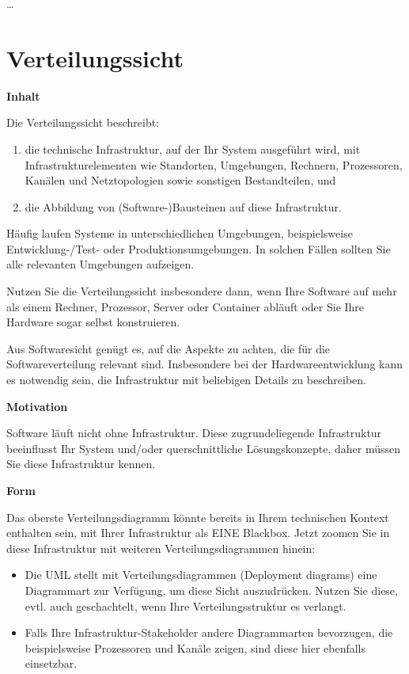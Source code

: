 \documentclass[a4paper,12pt]{article}
\begin{document}
\ldots\hspace{0pt}
\newpage
\section{Verteilungssicht}\label{section-deployment-view}

\textbf{Inhalt}

Die Verteilungssicht beschreibt:

\begin{enumerate}
\def\labelenumi{\arabic{enumi}.}
\item
  die technische Infrastruktur, auf der Ihr System ausgeführt wird, mit
  Infrastrukturelementen wie Standorten, Umgebungen, Rechnern,
  Prozessoren, Kanälen und Netztopologien sowie sonstigen Bestandteilen,
  und
\item
  die Abbildung von (Software-)Bausteinen auf diese Infrastruktur.
\end{enumerate}

Häufig laufen Systeme in unterschiedlichen Umgebungen, beispielsweise
Entwicklung-/Test- oder Produktionsumgebungen. In solchen Fällen sollten
Sie alle relevanten Umgebungen aufzeigen.

Nutzen Sie die Verteilungssicht insbesondere dann, wenn Ihre Software
auf mehr als einem Rechner, Prozessor, Server oder Container abläuft
oder Sie Ihre Hardware sogar selbst konstruieren.

Aus Softwaresicht genügt es, auf die Aspekte zu achten, die für die
Softwareverteilung relevant sind. Insbesondere bei der
Hardwareentwicklung kann es notwendig sein, die Infrastruktur mit
beliebigen Details zu beschreiben.

\textbf{Motivation}

Software läuft nicht ohne Infrastruktur. Diese zugrundeliegende
Infrastruktur beeinflusst Ihr System und/oder querschnittliche
Lösungskonzepte, daher müssen Sie diese Infrastruktur kennen.

\textbf{Form}

Das oberste Verteilungsdiagramm könnte bereits in Ihrem technischen
Kontext enthalten sein, mit Ihrer Infrastruktur als EINE Blackbox. Jetzt
zoomen Sie in diese Infrastruktur mit weiteren Verteilungsdiagrammen
hinein:

\begin{itemize}
\item
  Die UML stellt mit Verteilungsdiagrammen (Deployment diagrams) eine
  Diagrammart zur Verfügung, um diese Sicht auszudrücken. Nutzen Sie
  diese, evtl. auch geschachtelt, wenn Ihre Verteilungsstruktur es
  verlangt.
\item
  Falls Ihre Infrastruktur-Stakeholder andere Diagrammarten bevorzugen,
  die beispielsweise Prozessoren und Kanäle zeigen, sind diese hier
  ebenfalls einsetzbar.
\end{itemize}
\end{document}

